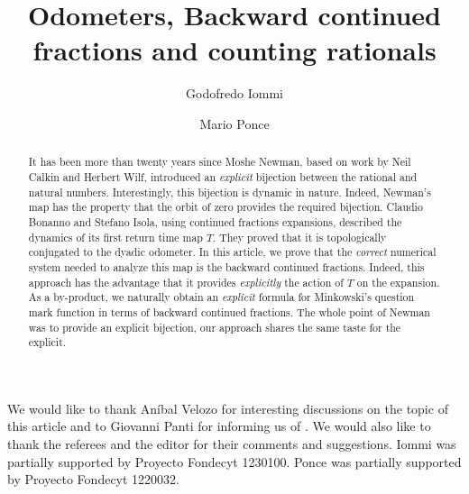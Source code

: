 \documentclass[letterpaper,10pt,reqno]{amsart}
\numberwithin{equation}{section}     %
\begin{document}
	
	

\title{Odometers, Backward continued fractions and counting rationals}





\begin{thanks}  {We would like to thank An\'ibal Velozo for interesting discussions on the topic of this article and to Giovanni Panti for informing us of \cite{bi}. We would also like to thank the referees and the editor for their comments and suggestions. Iommi was partially supported by Proyecto Fondecyt 1230100. Ponce was partially supported by Proyecto Fondecyt 1220032.}
 \end{thanks}
 
 
  
\author[G.~Iommi]{Godofredo Iommi} \address{Facultad de Matem\'aticas,
Pontificia Universidad Cat\'olica de Chile (UC), Avenida Vicu\~na Mackenna 4860, Santiago, Chile}


 \author[M.~Ponce]{Mario Ponce}   \address{Facultad de Matem\'aticas,
Pontificia Universidad Cat\'olica de Chile (UC), Avenida Vicu\~na Mackenna 4860, Santiago, Chile}





\maketitle


\begin{abstract}
It has been more than twenty years since Moshe Newman, based on work by Neil Calkin and Herbert Wilf, introduced  an \emph{explicit} bijection between the rational and natural numbers. Interestingly, this bijection is dynamic in nature. Indeed, Newman's map  has the property that the orbit of zero provides the required bijection. Claudio Bonanno and Stefano Isola, using continued fractions expansions, described the dynamics of  its first return time map $T$. They proved that it is topologically conjugated to the dyadic odometer. In this article, we prove that the \emph{correct} numerical system needed to analyze this map is the backward continued fractions. Indeed, this approach has the advantage that it provides  \emph{explicitly} the action of $T$ on the expansion. As a by-product, we naturally obtain an \emph{explicit} formula for Minkowski's  question mark function in terms of backward continued fractions.  The whole point of Newman was to provide an explicit bijection, our approach shares the same taste for the explicit.
\end{abstract}
\end{document}
